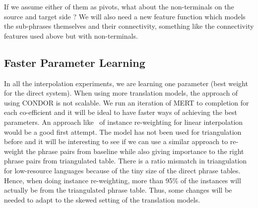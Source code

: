 	If we assume either of them as pivots, what about the non-terminals on the source and target side ? We will also need a new feature function which models the sub-phrases themselves and their connectivity, something like the connectivity features used above but with non-terminals. 

\subsection{Faster Parameter Learning}
	In all the interpolation experiments, we are learning one parameter (best weight for the direct system). When using more translation models, the approach of using CONDOR is not scalable. We run an iteration of MERT to completion for each co-efficient and it will be ideal to have faster ways of achieving the best parameters. An approach like~\cite{Foster:07} of instance re-weighting for linear interpolation would be a good first attempt. The model has not been used for triangulation before and it will be interesting to see if we can use a similar approach to re-weight the phrase pairs from baseline while also giving importance to the right phrase pairs from triangulated table. There is a ratio mismatch in triangulation for low-resource languages because of the tiny size of the direct phrase tables. Hence, when doing instance re-weighting, more than 95\% of the instances will actually be from the triangulated phrase table. Thus, some changes will be needed to adapt to the skewed setting of the translation models. 














